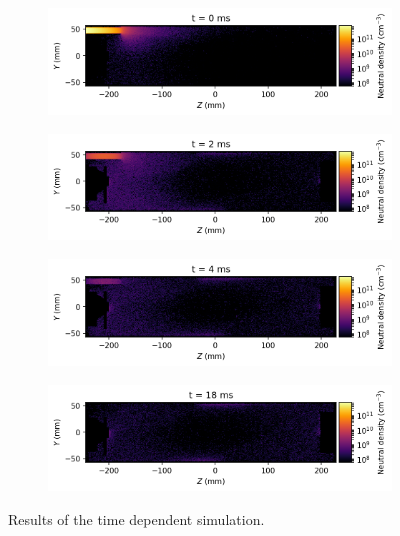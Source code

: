 \documentclass[a4paper,twoside,12pt]{article}
\begin{document}
\begin{figure}
    \centering
    \begin{subfigure}{0.8\textwidth}
        \centering
        \includegraphics[width=\linewidth]{images/time_slice_00.png}
    \end{subfigure}
    \begin{subfigure}{0.8\textwidth}
        \centering
        \includegraphics[width=\linewidth]{images/time_slice_02.png}
    \end{subfigure}
    \begin{subfigure}{0.8\textwidth}
        \centering
        \includegraphics[width=\linewidth]{images/time_slice_04.png}
    \end{subfigure}
    \begin{subfigure}{0.8\textwidth}
        \centering
        \includegraphics[width=\linewidth]{images/time_slice_18.png}
    \end{subfigure}
    \caption{Results of the time dependent simulation.}
    \label{fig:time_dependent}
\end{figure}
\end{document}
